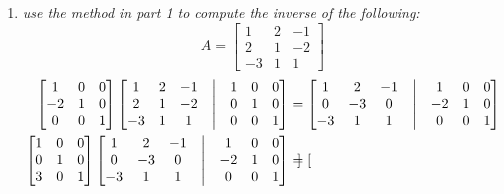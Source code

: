 \documentclass[12pt, letterpaper]{article}
\begin{document}
\begin{itemize}
\begin{enumerate}
$$			\right)			
			$$
			Note that since every matrix $H_i'$ is invertible by virtue of being a valid gaussian elimination matrix 
			means that $H'_l\cdots H_0' A$ is a non-singular matrix by virtue of all constituent matricies being 
			non-singular.  Therefore there exists $L_0,\cdots, L_r$ matricies such that 
			$L_r \cdots L_0 H_l' \cdots H_0' A = I_{n \times n}$.  However note that the matrix 
			$L_r \cdots L_0 H_l' \cdots H_0'$ is exactly the matrix that would be remaining on the right side of 
			the augmented matrix when we're done with Gaussian elimnation, and by the uniqueness of the inverse we have that 
			$A^{-1} = L_r \cdots L_0 H_l' \cdots H_0'$.  Thus the statement has been proven for $n$
\item \textit{use the method in part 1 to compute the inverse of the following: 
			$$			
			A = \begin{bmatrix}
			1 & 2 & -1\\ 2 & 1 & -2\\ -3 & 1 & 1
			\end{bmatrix}
			$$}
			\begin{align*}
			\begin{bmatrix}
			1 & 0 & 0\\ -2 & 1 & 0\\ 0 & 0 & 1
\end{bmatrix}						
			\begin{bmatrix}
			1 & 2 & -1 & \bigm| & 1 & 0 &0\\ 2 & 1 & -2& \bigm| & 0 & 1 &0\\ -3 & 1 & 1& \bigm| & 0 & 0 &1
			\end{bmatrix} &= 			\begin{bmatrix}
			1 & 2 & -1 & \bigm| & 1 & 0 &0\\ 0 & -3 & 0& \bigm| & -2 & 1 &0\\ -3 & 1 & 1& \bigm| & 0 & 0 &1
			\end{bmatrix}\\ 
						\begin{bmatrix}
			1 & 0 &0\\ 0 & 1 & 0\\ 3 & 0 & 1
			\end{bmatrix}
			\begin{bmatrix}
			1 & 2 & -1 & \bigm| & 1 & 0 &0\\ 0 & -3 & 0& \bigm| & -2 & 1 &0\\ -3 & 1 & 1& \bigm| & 0 & 0 &1
			\end{bmatrix} &= \begin{bmatrix}

\end{bmatrix}
\end{align*}
\end{enumerate}
\end{itemize}
\end{document}
